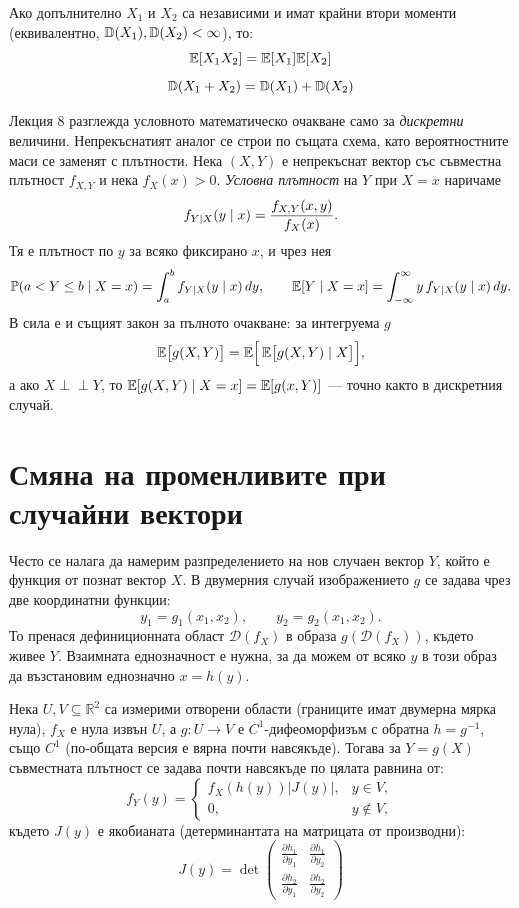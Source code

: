 Ако допълнително $X_1$ и $X_2$ са независими и имат крайни втори моменти (еквивалентно, $\mathbb{D}(X_1),\mathbb{D}(X_2)<\infty$), то:
\[
\mathbb{E}[X_1 X_2] = \mathbb{E}[X_1] \mathbb{E}[X_2]
\]
\[
\mathbb{D}(X_1 + X_2) = \mathbb{D}(X_1) + \mathbb{D}(X_2)
\]

\begin{supp}\label{supp:cond-density}
Лекция 8 разглежда условното математическо очакване само за \emph{дискретни} величини.
Непрекъснатият аналог се строи по същата схема, като вероятностните маси се заменят с
плътности. Нека $(X,Y)$ е непрекъснат вектор със съвместна плътност $f_{X,Y}$ и нека
$f_X(x) > 0$. \emph{Условна плътност} на $Y$ при $X = x$ наричаме
\[
f_{Y \mid X}(y \mid x) = \frac{f_{X,Y}(x,y)}{f_X(x)} .
\]
Тя е плътност по $y$ за всяко фиксирано $x$, и чрез нея
\[
\mathbb{P}(a < Y \le b \mid X = x) = \int_a^b f_{Y \mid X}(y \mid x)\, dy,
\qquad
\mathbb{E}[Y \mid X = x] = \int_{-\infty}^{\infty} y\, f_{Y \mid X}(y \mid x)\, dy .
\]
В сила е и същият закон за пълното очакване: за интегруема $g$
\[
\mathbb{E}\big[g(X,Y)\big] = \mathbb{E}\Big[\, \mathbb{E}\big[g(X,Y) \mid X\big] \Big] ,
\]
а ако $X \perp\!\!\!\perp Y$, то $\mathbb{E}[g(X,Y) \mid X = x] = \mathbb{E}[g(x,Y)]$ — точно както в
дискретния случай.
\end{supp}

\section{Смяна на променливите при случайни вектори}

Често се налага да намерим разпределението на нов случаен вектор $Y$, който е функция от познат вектор $X$.
В двумерния случай изображението $g$ се задава чрез две координатни функции:
\[
y_1=g_1(x_1,x_2),\qquad y_2=g_2(x_1,x_2).
\]
То пренася дефиниционната област $\mathcal{D}(f_X)$ в образа $g(\mathcal{D}(f_X))$, където живее $Y$. Взаимната еднозначност е нужна, за да можем от всяко $y$ в този образ да възстановим еднозначно $x=h(y)$.

\begin{keythm}
Нека $U,V\subseteq\mathbb{R}^2$ са измерими отворени области (границите имат двумерна мярка нула), $f_X$ е нула извън $U$, а $g:U\to V$ е $C^1$-дифеоморфизъм с обратна $h=g^{-1}$, също $C^1$ (по-общата версия е вярна почти навсякъде). Тогава за $Y=g(X)$ съвместната плътност се задава почти навсякъде по цялата равнина от:
\[
f_Y(y) =
\begin{cases}
f_X(h(y)) |J(y)|, & y\in V,\\
0, & y\notin V,
\end{cases}
\]
където $J(y)$ е якобианата (детерминантата на матрицата от производни):
\[
J(y) = \det \begin{pmatrix}
\frac{\partial h_1}{\partial y_1} & \frac{\partial h_1}{\partial y_2} \\
\frac{\partial h_2}{\partial y_1} & \frac{\partial h_2}{\partial y_2}
\end{pmatrix}
\]
\end{keythm}

